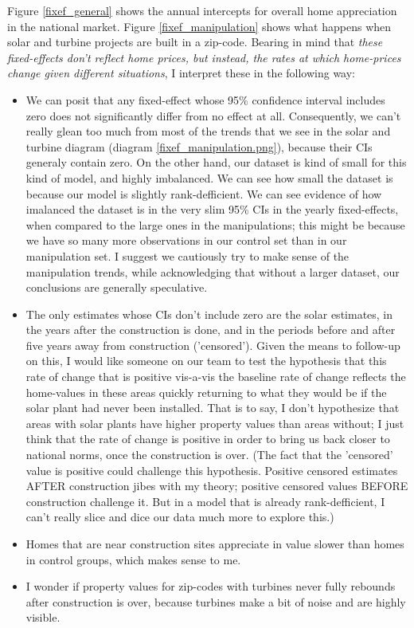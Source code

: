 \documentclass{article}
\begin{document}
Figure \ref{fixef_general} shows the annual intercepts for overall home appreciation in the national market.
Figure \ref{fixef_manipulation} shows what happens when solar and turbine projects are built in a zip-code.
Bearing in mind that \emph{these fixed-effects don't reflect home prices, but instead, the rates at which home-prices change given different situations}, I interpret these in the following way:
\begin{itemize}
\item We can posit that any fixed-effect whose 95\% confidence interval includes zero does not significantly differ from no effect at all. 
Consequently, we can't really glean too much from  most of the trends that we see in the solar and turbine diagram (diagram \ref{fixef_manipulation.png}), because their CIs generaly contain zero. 
On the other hand, our dataset is kind of small for this kind of model, and highly imbalanced. 
We can see how small the dataset is because our model is slightly rank-defficient.
We can see evidence of how imalanced the dataset is in the very slim 95\% CIs in the yearly fixed-effects, when compared to the large ones in the manipulations; this might be because we have so many more observations in our control set than in our manipulation set. 
I suggest we cautiously try to make sense of the manipulation trends, while acknowledging that without a larger dataset, our conclusions are generally speculative.
\item The only estimates whose CIs don't include zero are the solar estimates, in the years after the construction is done, and in the periods before and after five years away from construction ('censored'). 
Given the means to follow-up on this, I would like someone on our team to test the hypothesis that this rate of change that is positive vis-a-vis the baseline rate of change reflects the home-values in these areas quickly returning to what they would be if the solar plant had never been installed.
That is to say, I don't hypothesize that areas with solar plants have higher property values than areas without; I just think that the rate of change is positive in order to bring us back closer to national norms, once the construction is over. 
(The fact that the 'censored' value is positive could challenge this hypothesis. Positive censored estimates AFTER construction jibes with my theory; positive censored values BEFORE construction challenge it. But in a model that is already rank-defficient, I can't really slice and dice our data much more to explore this.) 
\item Homes that are near construction sites appreciate in value slower than homes in control groups, which makes sense to me.
\item I wonder if property values for zip-codes with turbines never fully rebounds after construction is over, because turbines make a bit of noise and are highly visible.
\end{itemize}
\end{document}

